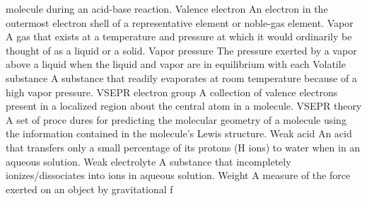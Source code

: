 \documentclass[10pt, roman]{article}
\begin{document}
molecule during an acid-base reaction. Valence electron An electron in the outermost electron shell of a representative element or noble-gas element. Vapor A gas that exists at a temperature and pressure at which it 
would ordinarily be thought of as a liquid or a solid. Vapor pressure The pressure exerted by a vapor above a liquid when the liquid and vapor are in equilibrium with each Volatile substance A substance that readily 
evaporates at room temperature because of a high vapor pressure. VSEPR electron group A collection of valence electrons present in a localized region about the central atom in a molecule. VSEPR theory A set of proce
dures for predicting the molecular geometry of a molecule using the information contained in the molecule’s Lewis structure. Weak acid An acid that transfers only a small percentage of its protons (H ions) to water 
when in an aqueous solution. Weak electrolyte A substance that incompletely ionizes/dissociates into ions in aqueous solution. Weight A measure of the force exerted on an object by gravitational
f
\end{document}
